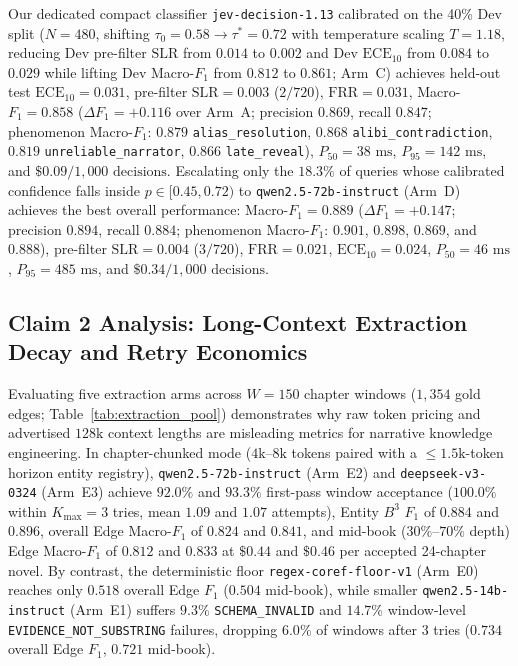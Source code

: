 \documentclass[11pt,twocolumn]{article}
\begin{document}
Our dedicated compact classifier \texttt{jev-decision-1.13} calibrated on the 40\% Dev split ($N = 480$, shifting $\tau_0 = 0.58 \to \tau^* = 0.72$ with temperature scaling $T = 1.18$, reducing Dev pre-filter $\text{SLR}$ from $0.014$ to $0.002$ and Dev $\text{ECE}_{10}$ from $0.084$ to $0.029$ while lifting Dev Macro-$F_1$ from $0.812$ to $0.861$; Arm~C) achieves held-out test $\text{ECE}_{10} = 0.031$, pre-filter $\text{SLR} = 0.003$ ($2/720$), $\text{FRR} = 0.031$, Macro-$F_1 = 0.858$ ($\Delta F_1 = +0.116$ over Arm~A; precision $0.869$, recall $0.847$; phenomenon Macro-$F_1$: $0.879$ \texttt{alias\_resolution}, $0.868$ \texttt{alibi\_contradiction}, $0.819$ \texttt{unreliable\_narrator}, $0.866$ \texttt{late\_reveal}), $P_{50} = 38\text{ ms}$, $P_{95} = 142\text{ ms}$, and $\$0.09 / 1{,}000\text{ decisions}$. Escalating only the $18.3\%$ of queries whose calibrated confidence falls inside $p \in [0.45, 0.72)$ to \texttt{qwen2.5-72b-instruct} (Arm~D) achieves the best overall performance: Macro-$F_1 = 0.889$ ($\Delta F_1 = +0.147$; precision $0.894$, recall $0.884$; phenomenon Macro-$F_1$: $0.901$, $0.898$, $0.869$, and $0.888$), pre-filter $\text{SLR} = 0.004$ ($3/720$), $\text{FRR} = 0.021$, $\text{ECE}_{10} = 0.024$, $P_{50} = 46\text{ ms}$, $P_{95} = 485\text{ ms}$, and $\$0.34 / 1{,}000\text{ decisions}$.



\subsection{Claim 2 Analysis: Long-Context Extraction Decay and Retry Economics}
\label{sec:claim2}

Evaluating five extraction arms across $W = 150$ chapter windows ($1{,}354$ gold edges; Table~\ref{tab:extraction_pool}) demonstrates why raw token pricing and advertised $128\text{k}$ context lengths are misleading metrics for narrative knowledge engineering. In chapter-chunked mode ($4\text{k--}8\text{k}$ tokens paired with a $\le 1.5\text{k}$-token horizon entity registry), \texttt{qwen2.5-72b-instruct} (Arm~E2) and \texttt{deepseek-v3-0324} (Arm~E3) achieve $92.0\%$ and $93.3\%$ first-pass window acceptance ($100.0\%$ within $K_{\max} = 3$ tries, mean $1.09$ and $1.07$ attempts), Entity $B^3$ $F_1$ of $0.884$ and $0.896$, overall Edge Macro-$F_1$ of $0.824$ and $0.841$, and mid-book ($30\%\text{--}70\%$ depth) Edge Macro-$F_1$ of $0.812$ and $0.833$ at $\$0.44$ and $\$0.46$ per accepted 24-chapter novel. By contrast, the deterministic floor \texttt{regex-coref-floor-v1} (Arm~E0) reaches only $0.518$ overall Edge $F_1$ ($0.504$ mid-book), while smaller \texttt{qwen2.5-14b-instruct} (Arm~E1) suffers $9.3\%$ \texttt{SCHEMA\_INVALID} and $14.7\%$ window-level \texttt{EVIDENCE\_NOT\_SUBSTRING} failures, dropping $6.0\%$ of windows after 3 tries ($0.734$ overall Edge $F_1$, $0.721$ mid-book).
\end{document}

